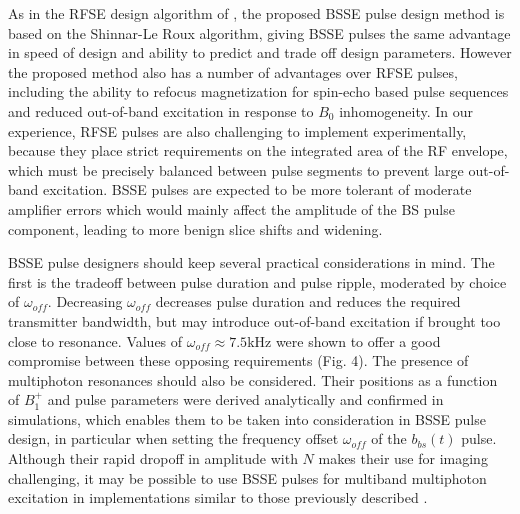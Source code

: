 \documentclass[a4paper,12pt]{article}
\newcommand{\bbst}{b_{bs}(t)}
\begin{document}
\par As in the RFSE design algorithm of \cite{Grissom2014B1+-selectiveAlgorithm}, 
the proposed BSSE pulse design method is based on the Shinnar-Le Roux algorithm, 
giving BSSE pulses the same advantage in speed of design and ability to predict and trade off design parameters. 
However the proposed method also has a number of advantages over RFSE pulses, 
including the ability to refocus magnetization for spin-echo based pulse sequences and reduced out-of-band excitation in response to $B_0$ inhomogeneity. 
In our experience, RFSE pulses are also challenging to implement experimentally, 
because they place strict requirements on the integrated area of the RF envelope, 
which must be precisely balanced between pulse segments to prevent large out-of-band excitation. 
BSSE pulses are expected to be more tolerant of moderate amplifier errors which would mainly affect the amplitude of the BS pulse component, 
leading to more benign slice shifts and widening.

\par BSSE pulse designers should keep several practical considerations in mind. 
The first is the tradeoff between pulse duration and pulse ripple, moderated by choice of $\omega_{off}$. 
Decreasing $\omega_{off}$ decreases pulse duration and reduces the required transmitter bandwidth, 
but may introduce out-of-band excitation if brought too close to resonance. 
Values of $\omega_{off} \approx 7.5$kHz were shown to offer a good compromise between these opposing requirements (Fig. 4). 
The presence of multiphoton resonances should also be considered. 
Their positions as a function of $B_1^+$ and pulse parameters were derived analytically
and confirmed in simulations, which enables them to be taken into consideration in BSSE pulse design,
in particular when setting the frequency offset $\omega_{off}$ of the $\bbst$ pulse. 
Although their rapid dropoff in amplitude with $N$ makes their use for imaging challenging, 
it may be possible to use BSSE pulses for multiband multiphoton excitation in implementations similar to those previously described \cite{Han2020MultiphotonImplementation}.
\end{document}
